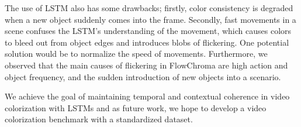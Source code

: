 \documentclass[10pt,twocolumn,letterpaper]{article}
\begin{document}
The use of LSTM also has some drawbacks; firstly, color consistency is degraded when a new object suddenly comes into the frame. Secondly, fast movements in a scene confuses the LSTM's understanding of the movement, which causes colors to bleed out from object edges and introduces blobs of flickering. One potential solution would be to normalize the speed of movements. Furthermore, we observed that the main causes of flickering in FlowChroma are high action and object frequency, and the sudden introduction of new objects into a scenario. 

We achieve the goal of maintaining temporal and contextual coherence in video colorization with LSTMs and as future work, we hope to develop a video colorization benchmark with a standardized dataset.





{\small


}
\end{document}

